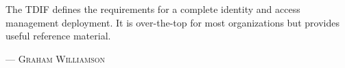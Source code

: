 The TDIF defines the requirements for a complete identity and access management deployment. It is over-the-top for most organizations but provides useful reference material.
\setlength{\parindent}{0cm}\par\textsc{ --- Graham Williamson }\par\vspace{12pt}\setlength{\parindent}{15pt}
